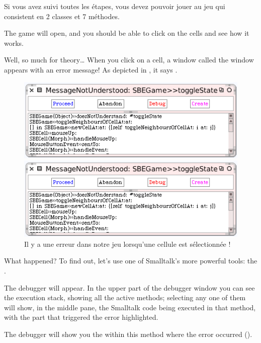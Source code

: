 \documentclass[a4paper,10pt,twoside]{book}
\begin{document}
Si vous avez suivi toutes les étapes, vous devez pouvoir jouer au jeu qui consistent en 2 classes et 7 méthodes.


The game will open, and you should be able to click on the cells and see how it works.

Well, so much for theory\ldots{}
When you click on a cell, a  window called the window appears with an error message!
As depicted in , it says .

\begin{figure}[ht]
\ifluluelse
	{\centerline{\includegraphics[width=\textwidth]{Error}}}
	{\centerline{\includegraphics[scale=0.7]{Error}}}
\caption{Il y a une erreur dans notre jeu lorsqu'une cellule est sélectionnée !
\label{fig:quintoError}}
\end{figure}

\noindent
What happened? To find out, let's use one of Smalltalk's more powerful tools: the .

The debugger will appear.
In the upper part of the debugger window you can see the execution stack, showing all the active methods; selecting any one of them will show, in the middle pane, the Smalltalk code being executed in that method, with the part that triggered the error highlighted.

The debugger will show you the  within this method where the error occurred ().
\end{document}
